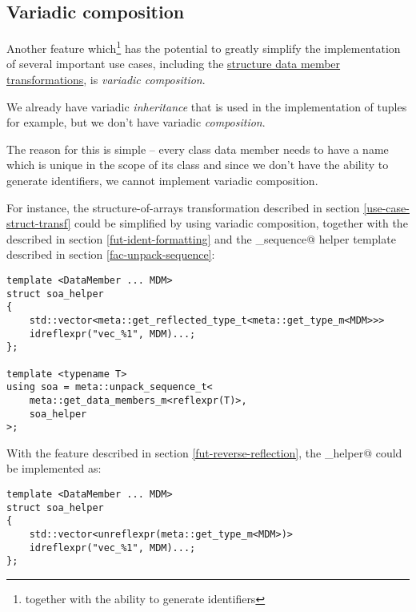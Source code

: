 \subsection{Variadic composition}
\label{fut-variadic-composition}

Another feature which\footnote{together with the ability to generate identifiers}
has the potential to greatly simplify the implementation of several important
use cases, including the \hyperref[use-case-struct-transf]{structure data
member transformations}, is {\em variadic composition}.

We already have variadic {\em inheritance} that is used in the implementation
of tuples for example, but we don't have variadic {\em composition}.

The reason for this is simple -- every class data member needs to have a name
which is unique in the scope of its class and since we don't have the ability
to generate identifiers, we cannot implement variadic composition.

For instance, the structure-of-arrays transformation described in section
\ref{use-case-struct-transf} could be simplified by using variadic composition,
together with the  described in section
\ref{fut-ident-formatting} and the \verb@unpack_sequence@ helper template
described in section \ref{fac-unpack-sequence}:

\begin{verbatim}
template <DataMember ... MDM>
struct soa_helper
{
	std::vector<meta::get_reflected_type_t<meta::get_type_m<MDM>>>
	idreflexpr("vec_%1", MDM)...;
};

template <typename T>
using soa = meta::unpack_sequence_t<
	meta::get_data_members_m<reflexpr(T)>,
	soa_helper
>;
\end{verbatim}

With the  feature described in section
\ref{fut-reverse-reflection}, the \verb@soa_helper@ could be implemented as:

\begin{verbatim}
template <DataMember ... MDM>
struct soa_helper
{
	std::vector<unreflexpr(meta::get_type_m<MDM>)>
	idreflexpr("vec_%1", MDM)...;
};
\end{verbatim}
